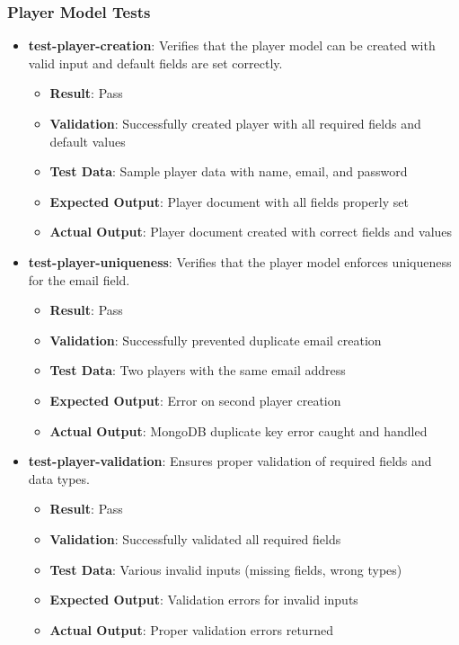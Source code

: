 \documentclass[12pt, titlepage]{article}
\begin{document}
\subsubsection{Player Model Tests}
\begin{itemize}
    \item \textbf{test-player-creation}: Verifies that the player model can be created with valid input and default fields are set correctly.
    \begin{itemize}
        \item \textbf{Result}: Pass
        \item \textbf{Validation}: Successfully created player with all required fields and default values
        \item \textbf{Test Data}: Sample player data with name, email, and password
        \item \textbf{Expected Output}: Player document with all fields properly set
        \item \textbf{Actual Output}: Player document created with correct fields and values
    \end{itemize}
    
    \item \textbf{test-player-uniqueness}: Verifies that the player model enforces uniqueness for the email field.
    \begin{itemize}
        \item \textbf{Result}: Pass
        \item \textbf{Validation}: Successfully prevented duplicate email creation
        \item \textbf{Test Data}: Two players with the same email address
        \item \textbf{Expected Output}: Error on second player creation
        \item \textbf{Actual Output}: MongoDB duplicate key error caught and handled
    \end{itemize}
    
    \item \textbf{test-player-validation}: Ensures proper validation of required fields and data types.
    \begin{itemize}
        \item \textbf{Result}: Pass
        \item \textbf{Validation}: Successfully validated all required fields
        \item \textbf{Test Data}: Various invalid inputs (missing fields, wrong types)
        \item \textbf{Expected Output}: Validation errors for invalid inputs
        \item \textbf{Actual Output}: Proper validation errors returned
    \end{itemize}
\end{itemize}
\end{document}
